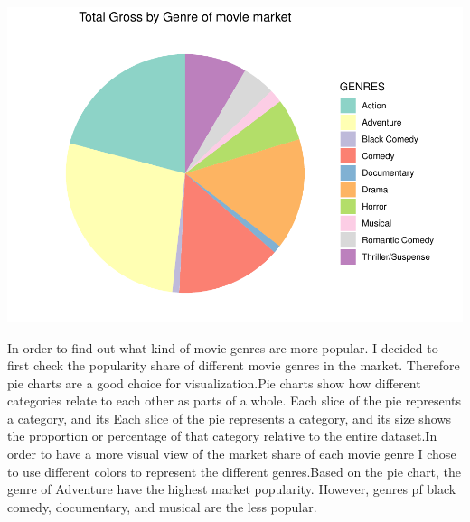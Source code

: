 \documentclass[
]{article}
\begin{document}
\includegraphics{Final-project_files/figure-latex/unnamed-chunk-1-1.pdf}

In order to find out what kind of movie genres are more popular. I
decided to first check the popularity share of different movie genres in
the market. Therefore pie charts are a good choice for visualization.Pie
charts show how different categories relate to each other as parts of a
whole. Each slice of the pie represents a category, and its Each slice
of the pie represents a category, and its size shows the proportion or
percentage of that category relative to the entire dataset.In order to
have a more visual view of the market share of each movie genre I chose
to use different colors to represent the different genres.Based on the
pie chart, the genre of Adventure have the highest market popularity.
However, genres pf black comedy, documentary, and musical are the less
popular.
\end{document}
